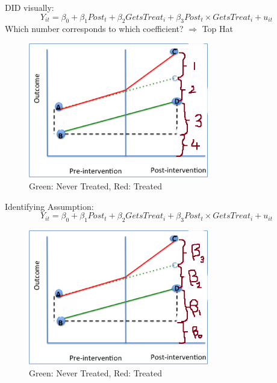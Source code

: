 \documentclass[
  ignorenonframetext,
]{beamer}
\begin{document}
\begin{frame}{DID visually:}
\protect\hypertarget{did-visually}{}
\[
Y_{it}=\beta_0+\beta_1 Post_t+\beta_2 GetsTreat_i+\beta_3 Post_t\times GetsTreat_i+u_{it}
\] Which number corresponds to which coefficient? \(\Rightarrow\) Top
Hat

\begin{figure}
\centering
\includegraphics[width=0.7\textwidth,height=\textheight]{"images/DIDregression.png"}
\caption{Green: Never Treated, Red: Treated}
\end{figure}
\end{frame}

\begin{frame}{Identifying Assumption:}
\protect\hypertarget{identifying-assumption-1}{}
\[
Y_{it}=\beta_0+\beta_1 Post_t+\beta_2 GetsTreat_i+\beta_3 Post_t\times GetsTreat_i+u_{it}
\]

\begin{figure}
\centering
\includegraphics[width=0.7\textwidth,height=\textheight]{"images/DIDregressionnum.png"}
\caption{Green: Never Treated, Red: Treated}
\end{figure}
\end{frame}
\end{document}
